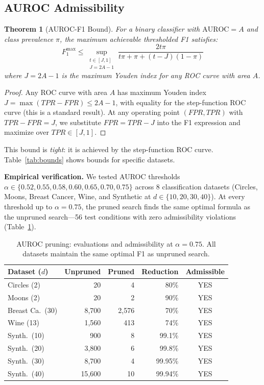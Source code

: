 \documentclass[journal]{IEEEtran}
\newtheorem{theorem}{Theorem}
\begin{document}
\subsection{AUROC Admissibility}

\begin{theorem}[AUROC-F1 Bound]
\label{thm:auroc_f1}
For a binary classifier with $\mathrm{AUROC} = A$ and class
prevalence $\pi$, the maximum achievable thresholded F1 satisfies:
\[
F_1^{\max} \leq \sup_{\substack{t \in [J, 1] \\ J = 2A-1}}
\frac{2 t \pi}{t \pi + \pi + (t - J)(1 - \pi)}
\]
where $J = 2A - 1$ is the maximum Youden index for any ROC curve
with area $A$.
\end{theorem}

\begin{proof}
Any ROC curve with area $A$ has maximum Youden index $J = \max(TPR
- FPR) \leq 2A - 1$, with equality for the step-function ROC curve
(this is a standard result). At any operating point
$(FPR, TPR)$ with $TPR - FPR = J$, we substitute $FPR = TPR - J$
into the F1 expression and maximize over $TPR \in [J, 1]$.
\end{proof}

This bound is \emph{tight}: it is achieved by the step-function ROC
curve. Table~\ref{tab:bounds} shows bounds for specific datasets.

\textbf{Empirical verification.} We tested AUROC thresholds
$\alpha \in \{0.52, 0.55, 0.58, 0.60, 0.65, 0.70, 0.75\}$ across
8 classification datasets (Circles, Moons, Breast Cancer, Wine, and
Synthetic at $d \in \{10, 20, 30, 40\}$). At every threshold up to
$\alpha = 0.75$, the pruned search finds the same optimal formula
as the unpruned search---56 test conditions with zero admissibility
violations (Table~\ref{tab:auroc}).

\begin{table}[h]
\caption{AUROC pruning: evaluations and admissibility at $\alpha = 0.75$.
All datasets maintain the same optimal F1 as unpruned search.}
\label{tab:auroc}
\scriptsize
\begin{tabular}{@{}lrrrc@{}}
\toprule
Dataset ($d$) & Unpruned & Pruned & Reduction & Admissible \\
\midrule
Circles (2) & 20 & 4 & 80\% & YES \\
Moons (2) & 20 & 2 & 90\% & YES \\
Breast Ca.\ (30) & 8{,}700 & 2{,}576 & 70\% & YES \\
Wine (13) & 1{,}560 & 413 & 74\% & YES \\
Synth.\ (10) & 900 & 8 & 99.1\% & YES \\
Synth.\ (20) & 3{,}800 & 6 & 99.8\% & YES \\
Synth.\ (30) & 8{,}700 & 4 & 99.95\% & YES \\
Synth.\ (40) & 15{,}600 & 10 & 99.94\% & YES \\
\bottomrule
\end{tabular}
\end{table}
\end{document}
